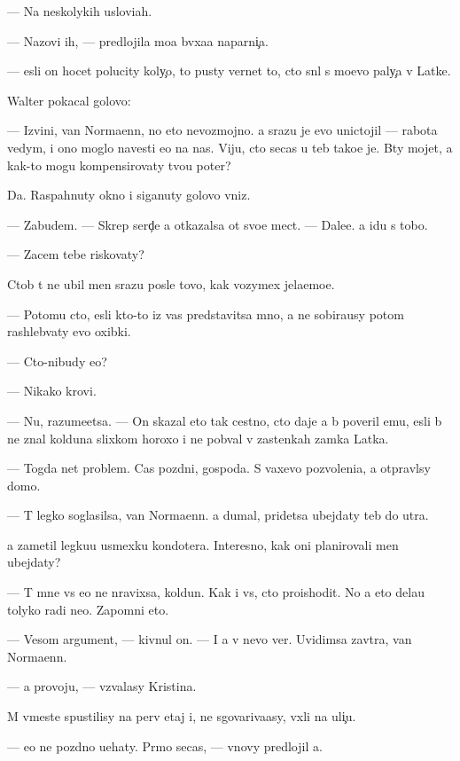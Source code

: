 \documentclass[10pt]{book}
\begin{document}
— Na neskolykih uslovi{\y}ah.

— Nazovi ih, — predlojila mo{\y}a b{\yi}vxa{\y}a naparni{\c}a.

— {\Y}esli on hocet polucity koly{\c}o, to pusty vernet to, cto sn{\ia}l s mo{\y}evo paly{\c}a v Latke.

Walter pokacal golovo{\y}:

— Izvini, van Normaenn, no eto nevozmojno. {\Y}a srazu je {\y}evo unictojil — rabota vedym{\yi}, i ono moglo navesti {\y}e{\y}o na nas. Viju, cto se{\y}cas u teb{\ia} tako{\y}e je. B{\yi}ty mojet, {\y}a kak-to mogu kompensirovaty tvo{\y}u poter{\iu}?

Da. Raspahnuty okno i siganuty golovo{\y} vniz.

— Zabudem. — Skrep{\ia} serd{\c}e {\y}a otkazalsa ot svo{\y}e{\y} mect{\yi}. — Dale{\y}e. {\Y}a idu s tobo{\y}.

— Zacem tebe riskovaty?

Ctob{\yi} t{\yi} ne ubil men{\ia} srazu posle tovo, kak vozymex jela{\y}emo{\y}e.

— Potomu cto, {\y}esli kto-to iz vas predstavitsa mno{\y}, {\y}a ne sobira{\y}usy potom rashleb{\yi}vaty {\y}evo oxibki.

— Cto-nibudy {\y}e{\x}o?

— Nikako{\y} krovi.

— Nu, razume{\y}etsa. — On skazal eto tak cestno, cto daje {\y}a b{\yi} poveril {\y}emu, {\y}esli b{\yi} ne znal kolduna slixkom horoxo i ne pob{\yi}val v zastenkah zamka Latka.

— Togda net problem. Cas pozdni{\y}, gospoda. S vaxevo pozvoleni{\y}a, {\y}a otpravl{\iu}sy domo{\y}.

— T{\yi} legko soglasilsa, van Normaenn. {\Y}a dumal, pridetsa ubejdaty teb{\ia} do utra.

{\Y}a zametil legku{\y}u usmexku kondot{\y}era. Interesno, kak oni planirovali men{\ia} ubejdaty?

— T{\yi} mne vs{\e} {\y}e{\x}o ne nravixsa, koldun. Kak i vs{\e}, cto proishodit. No {\y}a eto dela{\y}u tolyko radi ne{\y}o. Zapomni eto.

— Vesom{\yi}{\y} argument, — kivnul on. — I {\y}a v nevo ver{\iu}. Uvidimsa zavtra, van Normaenn.

— {\Y}a provoju, — v{\yi}zvalasy Kristina.

M{\yi} vmeste spustilisy na perv{\yi}{\y} etaj i, ne sgovariva{\y}asy, v{\yi}xli na uli{\c}u.

— {\Y}e{\x}o ne pozdno u{\y}ehaty. Pr{\ia}mo se{\y}cas, — vnovy predlojil {\y}a.
\end{document}
